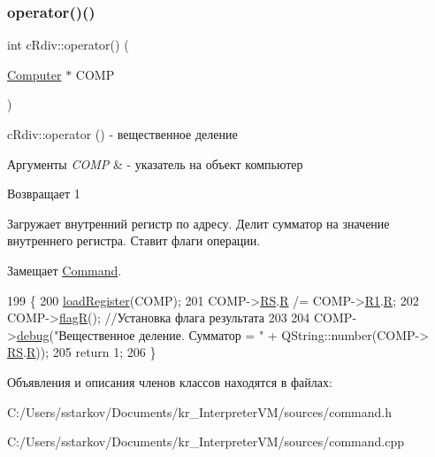 \subsubsection{\texorpdfstring{operator()()}{operator()()}}
{\footnotesize\ttfamily int c\+Rdiv\+::operator() (\begin{DoxyParamCaption}\item[{\hyperlink{class_computer}{Computer} $\ast$}]{C\+O\+MP }\end{DoxyParamCaption})\hspace{0.3cm}{\ttfamily [virtual]}}



c\+Rdiv\+::operator () -\/ вещественное деление 


\begin{DoxyParams}{Аргументы}
{\em C\+O\+MP} & -\/ указатель на объект компьютер \\
\hline
\end{DoxyParams}
\begin{DoxyReturn}{Возвращает}
1
\end{DoxyReturn}
Загружает внутренний регистр по адресу. Делит сумматор на значение внутреннего регистра. Ставит флаги операции. 

Замещает \hyperlink{class_command_a79939b66f3de892e91d7710844294716}{Command}.


\begin{DoxyCode}
199 \{
200     \hyperlink{class_command_aac6f368e7c9dbb357b3f00627d5dabfc}{loadRegister}(COMP);
201     COMP->\hyperlink{class_computer_a874503110664b3cf821118d2ce9c2b96}{RS}.\hyperlink{union_computer_1_1data_acbf8c96e22bd094bcbb4014818e3570d}{R} /= COMP->\hyperlink{class_computer_a0fbf84599b7db9d634a92afed443ee73}{R1}.\hyperlink{union_computer_1_1data_acbf8c96e22bd094bcbb4014818e3570d}{R};
202     COMP->\hyperlink{class_computer_aae860bb217270ec88e8ebf6fe2c2adc9}{flagR}(); \textcolor{comment}{//Установка флага результата}
203 
204     COMP->\hyperlink{class_computer_a10ca6c6b200630119201de16d7368e0f}{debug}(\textcolor{stringliteral}{"Вещественное деление. Сумматор = "} + QString::number(COMP->
      \hyperlink{class_computer_a874503110664b3cf821118d2ce9c2b96}{RS}.\hyperlink{union_computer_1_1data_acbf8c96e22bd094bcbb4014818e3570d}{R}));
205     \textcolor{keywordflow}{return} 1;
206 \}
\end{DoxyCode}


Объявления и описания членов классов находятся в файлах\+:\begin{DoxyCompactItemize}
\item 
C\+:/\+Users/sstarkov/\+Documents/kr\+\_\+\+Interpreter\+V\+M/sources/command.\+h\item 
C\+:/\+Users/sstarkov/\+Documents/kr\+\_\+\+Interpreter\+V\+M/sources/command.\+cpp\end{DoxyCompactItemize}
